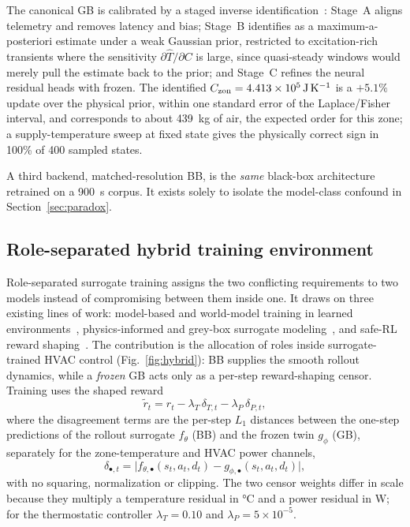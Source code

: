 The canonical GB is calibrated by a staged inverse
identification~\cite{Bacher2011RCIdentification}: Stage~A aligns telemetry and removes latency and
bias; Stage~B identifies \Czon{} as a maximum-a-posteriori estimate under a weak Gaussian prior,
restricted to excitation-rich transients where the sensitivity $\partial\widehat{T}/\partial C$ is
large, since quasi-steady windows would merely pull the estimate back to the prior; and Stage~C
refines the neural residual heads with \Czon{} frozen. The identified
$C_{\mathrm{zon}}=\SI{4.413e5}{\joule\per\kelvin}$ is a $+5.1\%$ update over the physical prior, within one
standard error of the Laplace/Fisher interval, and corresponds to about \SI{439}{\kilogram} of air,
the expected order for this zone; a supply-temperature sweep at fixed state gives the physically
correct sign in 100\% of 400 sampled states.

A third backend, matched-resolution BB, is the \emph{same} black-box architecture retrained on a
\SI{900}{\second} corpus. It exists solely to isolate the model-class confound in
Section~\ref{sec:paradox}.

\subsection{Role-separated hybrid training environment}\label{ssec:hybrid}
Role-separated surrogate training assigns the two conflicting requirements to two models instead of
compromising between them inside one. It draws on three existing lines of work: model-based and world-model training in learned
environments~\cite{Sutton1991Dyna,Hafner2025Dreamer}, physics-informed and grey-box surrogate
modeling~\cite{Bacher2011RCIdentification,Raissi2019PINN,Willard2022PIML}, and safe-RL reward
shaping~\cite{Garcia2015SafeRL,Wang2025SafeDRL}. The contribution is the allocation of roles inside
surrogate-trained HVAC control (Fig.~\ref{fig:hybrid}): BB supplies the smooth rollout dynamics,
while a \emph{frozen} GB acts only as a per-step reward-shaping censor. Training uses the shaped
reward
\begin{equation}
\tilde{r}_t=r_t-\lambda_T\,\delta_{T,t}-\lambda_P\,\delta_{P,t},
\label{eq:hybrid}
\end{equation}
where the disagreement terms are the per-step $L_1$ distances between the one-step predictions of
the rollout surrogate $f_\theta$ (BB) and the frozen twin $g_\phi$ (GB), separately for the
zone-temperature and HVAC power channels,
\begin{equation*}
\delta_{\bullet,t}=\big|f_{\theta,\bullet}(s_t,a_t,d_t)-g_{\phi,\bullet}(s_t,a_t,d_t)\big|,
\end{equation*}
with no squaring, normalization or clipping. The two censor weights differ in scale because they
multiply a temperature residual in \si{\celsius} and a power residual in \si{\watt}; for the
thermostatic controller $\lambda_T=0.10$ and $\lambda_P=5\times10^{-5}$.

